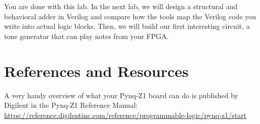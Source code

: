 \documentclass[11pt]{article}
\begin{document}
You are done with this lab. In the next lab, we will design a structural and behavioral adder in Verilog and compare how the tools map the Verilog code you write into actual logic blocks. Then, we will build our first interesting circuit, a tone generator that can play notes from your FPGA.

\section{References and Resources}

A very handy overview of what your Pynq-Z1 board can do is published by Digilent in the Pynq-Z1 Reference Manual: \url{https://reference.digilentinc.com/reference/programmable-logic/pynq-z1/start}
\end{document}
